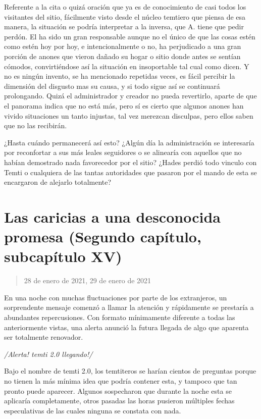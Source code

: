 \documentclass[
  spanish,
]{book}
\begin{document}
Referente a la cita o quizá oración que ya es de conocimiento de casi todos los visitantes del sitio, fácilmente visto desde el núcleo temtiero que piensa de esa manera, la situación se podría interpretar a la inversa, que A. tiene que pedir perdón. El ha sido un gran responsable aunque no el único de que las cosas estén como estén hoy por hoy, e intencionalmente o no, ha perjudicado a una gran porción de anones que vieron dañado su hogar o sitio donde antes se sentían cómodos, convirtiéndose así la situación en insoportable tal cual como dicen. Y no es ningún invento, se ha mencionado repetidas veces, es fácil percibir la dimensión del disgusto mas su causa, y si todo sigue así se continuará prolongando. Quizá el administrador y creador no pueda revertirlo, aparte de que el panorama indica que no está más, pero sí es cierto que algunos anones han vivido situaciones un tanto injustas, tal vez merezcan disculpas, pero ellos saben que no las recibirán.

¿Hasta cuándo permanecerá así esto? ¿Algún día la administración se interesaría por reconfortar a sus más leales seguidores o se alinearía con aquellos que no habían demostrado nada favorecedor por el sitio? ¿Hades perdió todo vinculo con Temti o cualquiera de las tantas autoridades que pasaron por el mando de esta se encargaron de alejarlo totalmente?

\hypertarget{las-caricias-a-una-desconocida-promesa-segundo-capuxedtulo-subcapuxedtulo-xv}{%
\section{Las caricias a una desconocida promesa (Segundo capítulo, subcapítulo XV)}\label{las-caricias-a-una-desconocida-promesa-segundo-capuxedtulo-subcapuxedtulo-xv}}

\begin{quote}
28 de enero de 2021, 29 de enero de 2021
\end{quote}

En una noche con muchas fluctuaciones por parte de los extranjeros, un sorprendente mensaje comenzó a llamar la atención y rápidamente se prestaría a abundantes repercusiones. Con formato mínimamente diferente a todas las anteriormente vistas, una alerta anunció la futura llegada de algo que aparenta ser totalmente renovador.

\emph{/Alerta! temti 2.0 llegando!/}

Bajo el nombre de temti 2.0, los temtiteros se harían cientos de preguntas porque no tienen la más mínima idea que podría contener esta, y tampoco que tan pronto puede aparecer. Algunos sospecharon que durante la noche esta se aplicaría completamente, otros pasadas las horas pusieron múltiples fechas especulativas de las cuales ninguna se constata con nada.
\end{document}
